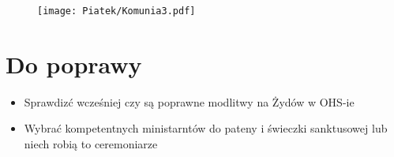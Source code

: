 \begin{itemize}
        \begin{figure}[h]
          \centering
          \texttt{[image: Piatek/Komunia3.pdf]}
        \end{figure}

\end{itemize}

\newpage

\section{Do poprawy}
\begin{itemize}
  \item Sprawdizć wcześniej czy są poprawne modlitwy na Żydów w OHS-ie
  \item Wybrać kompetentnych ministarntów do pateny i świeczki sanktusowej lub
        niech robią to ceremoniarze
\end{itemize}
